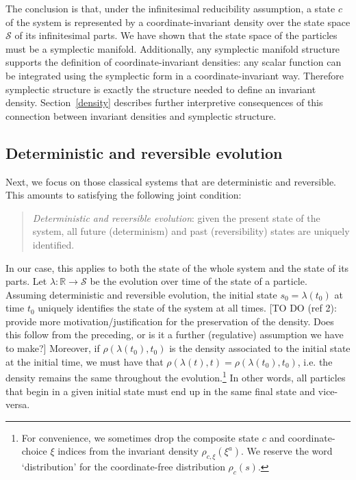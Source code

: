 \documentclass[12pt, english, twoside]{article} %
\newcommand\bs{\begin{singlespace}}
\newcommand\es{\end{singlespace}}
\begin{document}
The conclusion is that, under the infinitesimal reducibility assumption, a state $c$ of the system is represented by a coordinate-invariant density over the state space $\mathcal{S}$ of its infinitesimal parts. We have shown that the state space of the particles must be a symplectic manifold. Additionally, any symplectic manifold structure supports the definition of coordinate-invariant densities: any scalar function can be integrated using the symplectic form in a coordinate-invariant way. Therefore symplectic structure is exactly the structure needed to define an invariant density. Section~\ref{density} describes further interpretive consequences of this connection between invariant densities and symplectic structure.

\subsection{Deterministic and reversible evolution}
\label{deterministic}

Next, we focus on those classical systems that are deterministic and reversible. This amounts to satisfying the following joint condition:

\begin{quotation}
\bs
\noindent
\textit{Deterministic and reversible evolution}: given the present state of the system, all future (determinism) and past (reversibility) states are uniquely identified. \es
\end{quotation}

In our case, this applies to both the state of the whole system and the state of its parts. Let $\lambda: \mathbb{R} \to \mathcal{S}$ be the evolution over time of the state of a particle. Assuming deterministic and reversible evolution, the initial state $s_0 = \lambda(t_0)$ at time $t_0$ uniquely identifies the state of the system at all times. [TO DO (ref 2): provide more motivation/justification for the preservation of the density. Does this follow from the preceding, or is it a further (regulative) assumption we have to make?] Moreover, if $\rho(\lambda(t_0), t_0)$ is the density associated to the initial state at the initial time, we must have that $\rho(\lambda(t), t) = \rho(\lambda(t_0), t_0)$, i.e. the density remains the same throughout the evolution.\footnote{For convenience, we sometimes drop the composite state $c$ and coordinate-choice $\xi$ indices from the invariant density $\rho_{c, \xi} (\xi^a)$. We reserve the word `distribution' for the coordinate-free distribution $\rho_c (s)$. } In other words, all particles that begin in a given initial state must end up in the same final state and vice-versa.  
\end{document}
